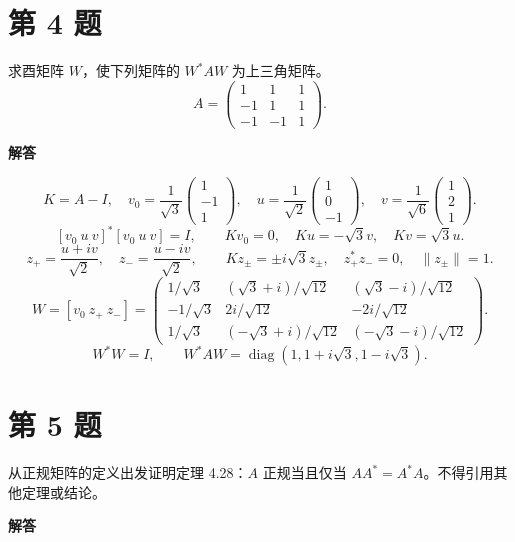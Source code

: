 \documentclass[UTF8,10pt,letterpaper,fontset=fandol]{ctexart}
\begin{document}
\section{第 4 题}
求酉矩阵 $W$，使下列矩阵的 $W^*AW$ 为上三角矩阵。
\[
 A=\begin{pmatrix}1&1&1\\-1&1&1\\-1&-1&1\end{pmatrix}.
\]

\par{}\textbf{解答}\par

\[
 K=A-I,\quad
 v_0=\frac1{\sqrt3}\begin{pmatrix}1\\-1\\1\end{pmatrix},\quad
 u=\frac1{\sqrt2}\begin{pmatrix}1\\0\\-1\end{pmatrix},\quad
 v=\frac1{\sqrt6}\begin{pmatrix}1\\2\\1\end{pmatrix}.
\]
\[
 [v_0\ u\ v]^*[v_0\ u\ v]=I,\qquad
 Kv_0=0,\quad Ku=-\sqrt3v,\quad Kv=\sqrt3u.
\]
\[
 z_+=\frac{u+iv}{\sqrt2},\quad z_-=\frac{u-iv}{\sqrt2},\qquad
 Kz_\pm=\pm i\sqrt3z_\pm,\quad z_+^*z_-=0,\quad\|z_\pm\|=1.
\]
\[
 \boxed{W=[v_0\ z_+\ z_-]=
 \begin{pmatrix}
 1/\sqrt3&(\sqrt3+i)/\sqrt{12}&(\sqrt3-i)/\sqrt{12}\\
 -1/\sqrt3&2i/\sqrt{12}&-2i/\sqrt{12}\\
 1/\sqrt3&(-\sqrt3+i)/\sqrt{12}&(-\sqrt3-i)/\sqrt{12}
 \end{pmatrix}}.
\]
\[
 W^*W=I,\qquad
 \boxed{W^*AW=\operatorname{diag}(1,1+i\sqrt3,1-i\sqrt3)}.
\]
\section{第 5 题}
从正规矩阵的定义出发证明定理 4.28：$A$ 正规当且仅当 $AA^*=A^*A$。不得引用其他定理或结论。
\par{}\textbf{解答}\par
\end{document}
